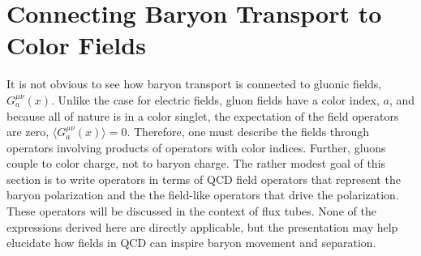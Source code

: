 \documentclass[aps, prc, 12pt, nofootinbib, showpacs, superscriptaddress, tightenlines, groupedaddress]{revtex4-2}
\begin{document}
\section{Connecting Baryon Transport to Color Fields}

It is not obvious to see how baryon transport is connected to gluonic fields, $G^{\mu\nu}_a(x)$. Unlike the case for electric fields, gluon fields have a color index, $a$, and because all of nature is in a color singlet, the expectation of the field operators are zero, $\langle G^{\mu\nu}_a(x)\rangle=0$. Therefore, one must describe the fields through operators involving products of operators with color indices. Further, gluons couple to color charge, not to baryon charge. The rather modest goal of this section is to write operators in terms of QCD field operators that represent the baryon polarization and the the field-like operators that drive the polarization. These operators will be discussed in the context of flux tubes. None of the expressions derived here are directly applicable, but the presentation may help elucidate how fields in QCD can inspire baryon movement and separation.
\end{document}
